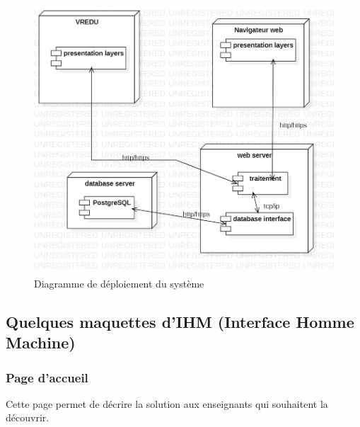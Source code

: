 \begin{figure}[H]
	\centering
	\includegraphics[width=1\textwidth]{img/dd}
	\caption{Diagramme de déploiement du système}
	\label{fig:mesh1}
\end{figure}

\subsection{Quelques maquettes d'IHM (Interface Homme Machine)}

\subsubsection{Page d'accueil}

Cette page permet de décrire la solution aux enseignants qui souhaitent la découvrir.

